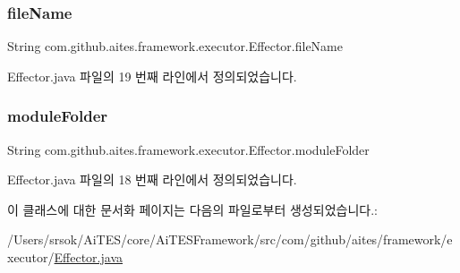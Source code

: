 \subsubsection{\texorpdfstring{file\+Name}{fileName}}
{\footnotesize\ttfamily String com.\+github.\+aites.\+framework.\+executor.\+Effector.\+file\+Name\hspace{0.3cm}{\ttfamily [private]}}



Effector.\+java 파일의 19 번째 라인에서 정의되었습니다.

\mbox{\label{classcom_1_1github_1_1aites_1_1framework_1_1executor_1_1_effector_abd3712d877c8ff7227be30b6503f2475}} 
\subsubsection{\texorpdfstring{module\+Folder}{moduleFolder}}
{\footnotesize\ttfamily String com.\+github.\+aites.\+framework.\+executor.\+Effector.\+module\+Folder\hspace{0.3cm}{\ttfamily [private]}}



Effector.\+java 파일의 18 번째 라인에서 정의되었습니다.



이 클래스에 대한 문서화 페이지는 다음의 파일로부터 생성되었습니다.\+:\begin{DoxyCompactItemize}
\item 
/\+Users/srsok/\+Ai\+T\+E\+S/core/\+Ai\+T\+E\+S\+Framework/src/com/github/aites/framework/executor/\mbox{\hyperlink{_effector_8java}{Effector.\+java}}\end{DoxyCompactItemize}
